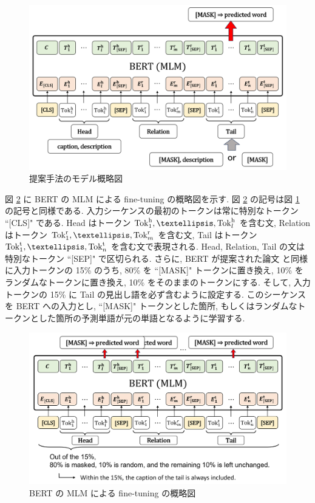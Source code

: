 \begin{figure}[t]
    \centering
    \includegraphics[width=16cm]{assets/KG-MLM.png}
    \caption{提案手法のモデル概略図}
    \label{KG-MLM}
\end{figure}

図 \ref{MLM_fine_tuning} に BERT の MLM による fine-tuning の概略図を示す. 図 \ref{MLM_fine_tuning} の記号は図 \ref{KG-MLM} の記号と同様である. 入力シーケンスの最初のトークンは常に特別なトークン ``[CLS]" である. Head はトークン ${\rm Tok}_{1}^{\rm h}, …,{\rm Tok}_{l}^{\rm h}$ を含む文, Relation はトークン ${\rm Tok}_{1}^{\rm r}, …,{\rm Tok}_{m}^{\rm r}$ を含む文, Tail はトークン ${\rm Tok}_{1}^{\rm t}, …,{\rm Tok}_{n}^{\rm t}$ を含む文で表現される. Head, Relation, Tail の文は特別なトークン ``[SEP]" で区切られる. さらに, BERT が提案された論文 \cite{BERT} と同様に入力トークンの 15\% のうち, 80\% を ``[MASK]" トークンに置き換え, 10\% をランダムなトークンに置き換え, 10\% をそのままのトークンにする. そして, 入力トークンの 15\% に Tail の見出し語を必ず含むように設定する. このシーケンスを BERT への入力とし, ``[MASK]" トークンとした箇所, もしくはランダムなトークンとした箇所の予測単語が元の単語となるように学習する. \par

\begin{figure}[t]
    \centering
    \includegraphics[width=16cm]{assets/MLM_fine-tuning_English.png}
    \caption{BERT の MLM による fine-tuning の概略図}
    \label{MLM_fine_tuning}
\end{figure}

